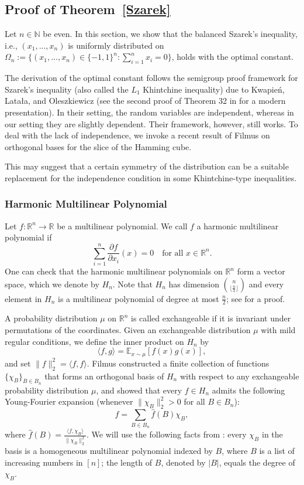\documentclass[11pt]{article}
\begin{document}
\subsection{Proof of Theorem~\ref{Szarek}}
Let $n \in \mathbb{N}$ be even. In this section, we show that the balanced Szarek's inequality, i.e.,  $(x_1,...,x_n)$ is uniformly distributed on $\Omega_n:=\{(x_1,...,x_n) \in \{-1,1\}^n:\sum_{i=1}^n x_i =0\}$, holds with the optimal constant.

The derivation of the optimal constant follows the semigroup proof framework for Szarek's inequality (also called the \(L_1\) Khintchine inequality) due to Kwapie\'n, Lata\l a, and Oleszkiewicz \cite{KwapienLatalaOleszkiewicz96,LatalaOleszkiewicz94,LatalaOleszkiewicz94} (see the second proof of Theorem 32 in \cite{NT23} for a modern presentation). In their setting, the random variables are independent, whereas in our setting they are slightly dependent. Their framework, however, still works. To deal with the lack of independence, we invoke a recent result of Filmus \cite{Filmus16} on orthogonal bases for the slice of the Hamming cube.

This may suggest that a certain symmetry of the distribution can be a suitable replacement for the independence condition in some Khintchine-type inequalities. 

\subsubsection{Harmonic Multilinear Polynomial}
Let $f:\mathbb{R}^n \to \mathbb{R}$ be a multilinear polynomial. We call $f$ a harmonic multilinear polynomial if 
\[
\sum_{i=1}^n \frac{\partial f}{\partial x_i}(x)=0 \quad \text{for all } x \in \mathbb{R}^n.
\]
One can check that the harmonic multilinear polynomials on $\mathbb{R}^n$ form a vector space, which we denote by $H_n$. Note that $H_n$ has dimension $\binom{n}{\lfloor\frac{n}{2}\rfloor}$ and every element in $H_n$ is a multilinear polynomial of degree at most $\frac{n}{2}$; see \cite[Lemma 2]{Filmus16} for a proof. 

A probability distribution $\mu$ on $\mathbb{R}^n$ is called exchangeable if it is invariant under permutations of the coordinates. Given an exchangeable distribution $\mu$ with mild regular conditions, we define the inner product on $H_n$ by 
\[
\langle f,g \rangle=\mathbb{E}_{x\sim\mu}[f(x)g(x)], 
\]
and set $\| f \|_2^2 = \langle f,f \rangle$. 
Filmus \cite[Section 3]{Filmus16} constructed a finite collection of functions $\{\chi_B\}_{B \in B_n}$ that forms an orthogonal basis of $H_n$ with respect to any exchangeable probability distribution $\mu$, and showed that every $f\in H_n$ admits the following Young-Fourier expansion  (whenever $\|\chi_B\|_2^2 > 0$ for all $B \in B_n$):
\[
f = \sum_{B \in B_n}\widehat f(B)\chi_B,
\]
where $\widehat f(B)=\frac{\langle f,\chi_B \rangle}{\|\chi_B\|_2^2}$. We will use the following facts from \cite[Section 3]{Filmus16}: every $\chi_B$ in the basis is a homogeneous multilinear polynomial indexed by $B$, where $B$ is a list of increasing numbers in $[n]$; the length of $B$, denoted by $|B|$, equals the degree of $\chi_B$.  
\end{document}
